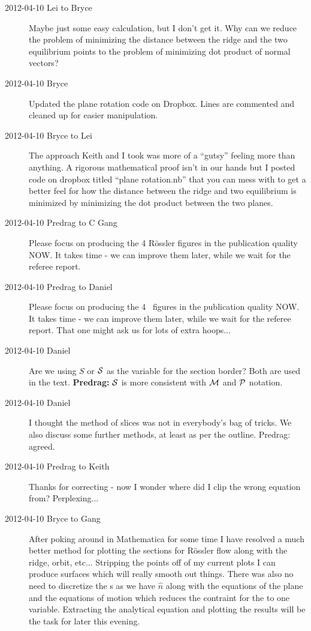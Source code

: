 \begin{description}
\item[2012-04-10 Lei to Bryce] Maybe just some easy calculation, but I don't get it. Why can we reduce the problem of minimizing the distance between the ridge and the two equilibrium points to the problem of minimizing dot product of normal vectors?

\item[2012-04-10 Bryce] Updated the plane rotation code on Dropbox. Lines
are commented and cleaned up for easier manipulation.

\item[2012-04-10 Bryce to Lei] The approach Keith and I took was more of
a ``gutsy'' feeling more than anything. A rigorous mathematical proof
isn't in our hands but I posted code on dropbox titled ``plane
rotation.nb'' that you can mess with to get a better feel for how the
distance between the ridge and two equilibrium is minimized by minimizing
the dot product between the two planes.

\item[2012-04-10 Predrag to C Gang]
Please focus on producing the 4 R\"ossler figures in the publication quality NOW.
It takes time - we can improve them later, while we wait for the referee report.

\item[2012-04-10 Predrag to Daniel]
Please focus on producing the 4 \cLe\ figures in the publication quality NOW.
It takes time - we can improve them later, while we wait for the referee report.
That one might ask us for lots of extra hoops...

\item[2012-04-10 Daniel] Are we using $S$ or ${\cal S}$ as the variable
for the section border? Both are used in the text.
{\bf Predrag:} ${\cal S}$ is more consistent with ${\cal M}$ and ${\cal P}$
notation.

\item[2012-04-10 Daniel] I thought the method of slices was not in
everybody's bag of tricks. We also discuss some further methods, at least
as per the outline. Predrag: agreed.

\item[2012-04-10 Predrag to Keith] Thanks for correcting
 - now I wonder where did I clip the wrong equation
from? Perplexing...

\item[2012-04-10 Bryce to Gang] After poking around in Mathematica for
some time I have resolved a much better method for plotting the sections
for R\"ossler flow along with the ridge, orbit, etc... Stripping the
points off of my current plots I can produce surfaces which will really
smooth out things. There was also no need to discretize the {\poincBord
s} as we have $\hat{n}$ along with the equations of the plane and the
equations of motion which reduces the contraint for the {\poincBord} to
one variable. Extracting the analytical equation and plotting the results
will be the task for later this evening.


\end{description}
